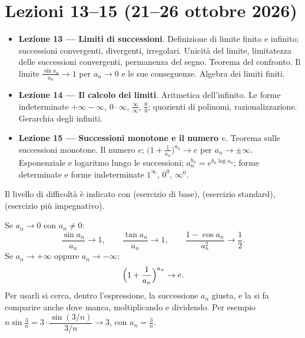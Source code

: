 \chapter{Lezioni 13--15 (21--26 ottobre 2026)}

\begin{vuoto}{}
\begin{itemize}
\item[\bul] \textbf{Lezione 13 --- Limiti di successioni}. Definizione di limite finito e infinito; successioni convergenti, divergenti, irregolari. Unicità del limite, limitatezza delle successioni convergenti, permanenza del segno. Teorema del confronto. Il limite $\frac{\sin a_n}{a_n}\to1$ per $a_n\to0$ e le sue conseguenze. Algebra dei limiti finiti.
\item[\bul] \textbf{Lezione 14 --- Il calcolo dei limiti}. Aritmetica dell'infinito. Le forme indeterminate $+\infty-\infty$, $0\cdot\infty$, $\frac\infty\infty$, $\frac00$; quozienti di polinomi, razionalizzazione. Gerarchia degli infiniti.
\item[\bul] \textbf{Lezione 15 --- Successioni monotone e il numero $e$}. Teorema sulle successioni monotone. Il numero $e$; $\bigl(1+\frac1{a_n}\bigr)^{a_n}\to e$ per $a_n\to\pm\infty$. Esponenziale e logaritmo lungo le successioni; $a_n^{b_n}=e^{b_n\log a_n}$; forme determinate e forme indeterminate $1^\infty$, $0^0$, $\infty^0$.
\end{itemize}
\end{vuoto}

Il livello di difficoltà è indicato con  (esercizio di base),  (esercizio standard),  (esercizio più impegnativo).

\begin{vuoto}{}
Se $a_n\to0$ con $a_n\ne0$:
\[
\frac{\sin a_n}{a_n}\to1,\qquad \frac{\tan a_n}{a_n}\to1,\qquad \frac{1-\cos a_n}{a_n^2}\to\frac12 .
\]
Se $a_n\to+\infty$ oppure $a_n\to-\infty$:
\[
\Bigl(1+\frac1{a_n}\Bigr)^{a_n}\to e .
\]
Per usarli si cerca, dentro l'espressione, la successione $a_n$ giusta, e la si fa comparire anche dove manca, moltiplicando e dividendo. Per esempio $n\sin\frac3n=3\cdot\dfrac{\sin(3/n)}{3/n}\to3$, con $a_n=\frac3n$.
\end{vuoto}

